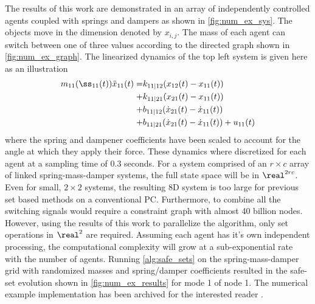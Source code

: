 The results of this work are demonstrated in an array of independently controlled agents coupled with springs and dampers as shown in \autoref{fig:num_ex_sys}. The objects move in the dimension denoted by $x_{i,j}$. The mass of each agent can switch between one of three values according to the directed graph shown in \autoref{fig:num_ex_graph}. The linearized dynamics of the top left system is given here as an illustration 
\begin{align*}
m_{11}(\ss_{11}(t))\ddot{x}_{11}(t) = &k_{11|12}(x_{12}(t)-x_{11}(t))\\
+&k_{11|21}(x_{21}(t)-x_{11}(t))\\
+&b_{11|12}(\dot x_{21}(t)-\dot x_{11}(t))\\
+&b_{11|21}(\dot x_{21}(t)-\dot x_{11}(t)) + u_{11}(t)
\end{align*}
 where the spring and dampener coefficients have been scaled to account for the angle at which they apply their force. These dynamics where discretized for each agent at a sampling time of $0.3$ seconds. For a system comprised of an $r\times c$ array of linked spring-mass-damper systems, the full state space will be in $\real^{2rc}$. Even for small, $2\times 2$ systems, the resulting 8D system is too large for previous set based methods on a conventional PC. Furthermore, to combine all the switching signals would require a constraint graph with almost 40 billion nodes. 
 However, using the results of this work to parallelize the algorithm, only set operations in $\real^2$ are required. Assuming each agent has it's own independent processing, the computational complexity will grow at a sub-exponential rate with the number of agents. Running \autoref{alg:safe_sets} on the spring-mass-damper grid with randomized masses and spring/damper coefficients resulted in the safe-set evolution shown in \autoref{fig:num_ex_results} for mode 1 of node 1. The numerical example implementation has been archived for the interested reader \cite{PaperSoftware}. 